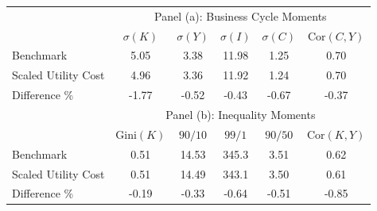 \begin{tabular}{lccccc}
\toprule
\toprule
&\multicolumn{5}{c}{Panel (a): Business Cycle Moments}\\
& $\sigma(K)$ & $\sigma(Y)$ & $\sigma(I)$ & $\sigma(C)$ & $\text{Cor}(C,Y)$\\
\midrule
Benchmark & 5.05 & 3.38 & 11.98 & 1.25 & 0.70\\ 
Scaled Utility Cost & 4.96 & 3.36 & 11.92 & 1.24 & 0.70\\ 
Difference \% & -1.77 & -0.52 & -0.43 & -0.67 & -0.37\\ 
\midrule
&\multicolumn{5}{c}{Panel (b): Inequality Moments}\\
& $\text{Gini}(K)$ & $90/10$ & $99/1$ & $90/50$ & $\text{Cor}(K,Y)$ \\
\midrule
Benchmark & 0.51 & 14.53 & 345.3 &3.51 & 0.62 \\ 
Scaled Utility Cost & 0.51 & 14.49 & 343.1 & 3.50 & 0.61 \\ 
Difference \% & -0.19 & -0.33 & -0.64 & -0.51 & -0.85 \\ 
\bottomrule
\bottomrule
\end{tabular}
